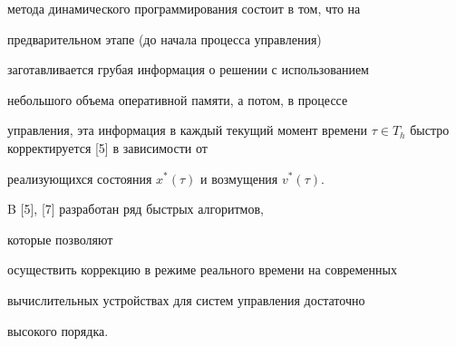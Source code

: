 метода динамического программирования состоит в том, что на


предварительном этапе (до начала процесса управления)


заготавливается грубая информация о решении с использованием


небольшого объема оперативной памяти, а потом, в процессе


управления, эта информация в каждый текущий момент времени $\tau


\in T_{h}$ быстро корректируется [5] в зависимости от


реализующихся состояния $x^*(\tau)$ и возмущения $v^*(\tau)$.


B [5], [7] разработан ряд быстрых алгоритмов,


которые позволяют


осуществить коррекцию в режиме реального времени на современных


вычислительных устройствах для систем управления достаточно


высокого порядка.








